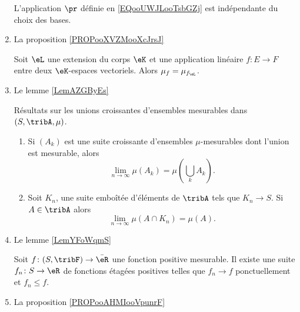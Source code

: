 \begin{enumerate}
            \begin{proposition}
    L'application \( \pr\) définie en \eqref{EQooUWJLooTsbGZj} est indépendante du choix des bases.
            \end{proposition}

        \item La proposition \ref{PROPooXVZMooXcJrsJ}
            \begin{proposition}
    Soit \( \eL\) une extension du corps \( \eK\) et une application linéaire \( f\colon E\to F\) entre deux \( \eK\)-espaces vectoriels. Alors \( \mu_f=\mu_{f_{\eL}}\).
\end{proposition}
\item
    Le lemme \ref{LemAZGByEs}

    \begin{lemma}
    Résultats sur les unions croissantes d'ensembles mesurables dans \( (S,\tribA,\mu)\).
    \begin{enumerate}
        \item
        Si \( (A_k)\) est une suite croissante d'ensembles \( \mu\)-mesurables dont l'union est mesurable, alors
        \begin{equation}
            \lim_{n\to \infty} \mu(A_k)=\mu(\bigcup_kA_k).
        \end{equation}

    \item
        Soit \( K_n\), une suite emboîtée d'éléments de \( \tribA\) tels que \( K_n\to S\). Si \( A\in\tribA\) alors
        \begin{equation}
            \lim_{n\to \infty} \mu(A\cap K_n)=\mu(A).
        \end{equation}
    \end{enumerate}
\end{lemma}

\item Le lemme \ref{LemYFoWqmS}

    \begin{lemma}
    Soit \( f\colon (S,\tribF)\to \bar\eR\) une fonction positive mesurable. Il existe une suite \( f_n\colon S\to \eR\) de fonctions étagées positives telles que \( f_n\to f\) ponctuellement et \( f_n \leq f\).
\end{lemma}

\item    La proposition \ref{PROPooAHMIooVpunrF}


\end{enumerate}
